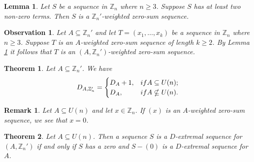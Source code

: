 \documentclass[10pt,a4paper]{amsart}
\newtheorem{theorem}{Theorem}
\newtheorem{lemma}{Lemma}
\newtheorem{observation}{Observation}
\newtheorem{remark}{Remark}
\begin{document}
\begin{lemma}\label{z'}
Let $S$ be a sequence in $\mathbb Z_n$ where $n\geq 3$. Suppose $S$ has at least two non-zero terms. Then $S$ is a $\mathbb Z_n'$-weighted zero-sum sequence.
\end{lemma}

\begin{observation}\label{1zn}
Let $A\subseteq \mathbb Z_n'$ and let $T=(x_1,\ldots,x_k)$ be a sequence in $\mathbb Z_n$ where $n\geq 3$. Suppose $T$ is an $A$-weighted zero-sum sequence of length $k\geq 2$. By Lemma \ref{z'} it follows that $T$ is an $(A,\mathbb Z_n')$-weighted zero-sum sequence.
\end{observation}

\begin{theorem}\label{dan}
Let $A\subseteq \mathbb Z_n'$. We have
\[D_{A,\mathbb Z_n'}=
\begin{cases}
D_A+1, & \emph {if }A\subseteq U(n); \\
D_A, & \emph{if }A\nsubseteq U(n).
\end{cases}\]
\end{theorem}

\begin{remark}\label{zun}
Let $A\subseteq U(n)$ and let $x\in \mathbb Z_n$. If $(x)$ is an $A$-weighted zero-sum sequence, we see that $x=0$.
\end{remark}

\begin{theorem}\label{da'}
Let $A\subseteq U(n)$. Then a sequence $S$ is a $D$-extremal sequence for $(A,\mathbb Z_n')$ if and only if $S$ has a zero and $S-(0)$ is a $D$-extremal sequence for $A$.
\end{theorem}
\end{document}
